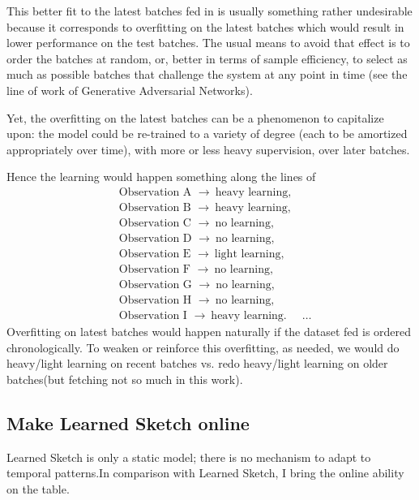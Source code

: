 This better fit to the latest batches fed in is usually something rather undesirable because it corresponds to overfitting on the latest batches which would result in lower performance on the test batches. The usual means to avoid that effect is to order the batches at random, or, better in terms of sample efficiency, to select as much as possible batches that challenge the system at any point in time (see the line of work of Generative Adversarial Networks).

Yet, the overfitting on the latest batches can be a phenomenon to capitalize upon: the model could be re-trained to a variety of degree (each to be amortized appropriately over time), with more or less heavy supervision, over later batches.

Hence the learning would happen something along the lines of
\begin{align*}
& \text{Observation A }\longrightarrow~\text{heavy learning},\\
& \text{Observation B }\longrightarrow~\text{heavy learning},\\
& \text{Observation C }\longrightarrow~\text{no learning},\\
& \text{Observation D }\longrightarrow~\text{no learning},\\
& \text{Observation E }\longrightarrow~\text{light learning},\\
& \text{Observation F }\longrightarrow~\text{no learning},\\
& \text{Observation G }\longrightarrow~\text{no learning},\\
& \text{Observation H }\longrightarrow~\text{no learning},\\
& \text{Observation I }\longrightarrow~\text{heavy learning}.
& \ldots
\end{align*}
%
Overfitting on latest batches would happen naturally if the dataset fed is ordered chronologically. To weaken or reinforce this overfitting, as needed, we would do heavy/light learning on recent batches vs. redo heavy/light learning on older batches(but fetching not so much in this work).

\subsection{Make Learned Sketch online} \label{sec:Online_training}
Learned Sketch is only a static model; there is no mechanism to adapt to temporal patterns.In comparison with Learned Sketch, I bring the online ability on the table. 

